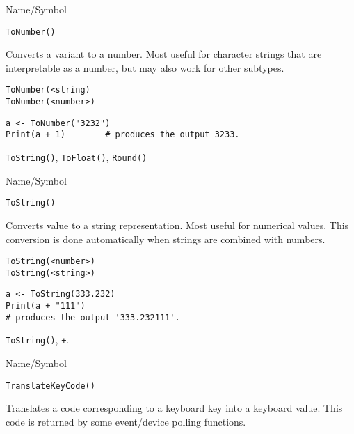\rl


\begin{desc}{Name/Symbol}
\item[Name/Symbol]  	\verb+ToNumber()+

\item[Description] Converts a variant to a number. Most useful for
  character strings that are interpretable as a number, but may also
  work for other subtypes.

\item[Usage]     
\begin{verbatim}
ToNumber(<string)
ToNumber(<number>)
\end{verbatim}

\item[Example]
\begin{verbatim}
a <- ToNumber("3232")
Print(a + 1)		# produces the output 3233. 
\end{verbatim}

\item[See Also]     	\verb+ToString()+, \verb+ToFloat()+, \verb+Round()+
\end{desc}

\rl


\begin{desc}{Name/Symbol}
\item[Name/Symbol]  	\verb+ToString()+

\item[Description] Converts value to a string representation. Most
  useful for numerical values.  This conversion is done automatically
  when strings are combined with numbers.

\item[Usage]     
\begin{verbatim}
ToString(<number>)
ToString(<string>)
\end{verbatim}

\item[Example]
\begin{verbatim}
a <- ToString(333.232)
Print(a + "111")
# produces the output '333.232111'.
\end{verbatim}
		

\item[See Also] \verb+ToString()+, \verb|+|.
\end{desc}

\rl


\begin{desc}{Name/Symbol}
\item[Name/Symbol]  	\verb+TranslateKeyCode()+

\item[Description] Translates a code corresponding to a keyboard key
  into a keyboard value.  This code is returned by some event/device
  polling functions.

\item[Usage]		

\item[Example]	

\item[See Also]	
\end{desc}

